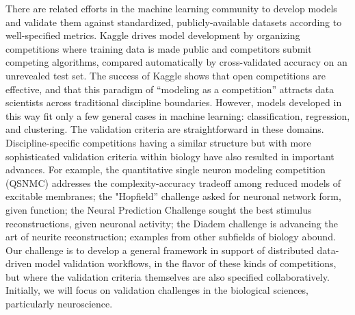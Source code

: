 \documentclass[11pt,letterpaper]{article}
\begin{document}
There are related efforts in the machine learning community to develop models and validate them against standardized, publicly-available datasets according to well-specified metrics. Kaggle\cite{kaggle_url} drives model development by organizing competitions where training data is made public and competitors submit competing algorithms, compared automatically by cross-validated accuracy on an unrevealed test set. The success of Kaggle\cite{carpenter_may_2011} shows that open competitions are effective, and that this paradigm of ``modeling as a competition'' attracts data scientists across traditional discipline boundaries. However, models developed in this way fit only a few general cases in machine learning: classification, regression, and clustering. The validation criteria are straightforward in these domains. Discipline-specific competitions having a similar structure but with more sophisticated validation criteria within biology have also resulted in important advances. For example, the quantitative single neuron modeling competition (QSNMC)\cite{jolivet_quantitative_2008} addresses the complexity-accuracy tradeoff among reduced models of excitable membranes; the "Hopfield'' challenge\cite{hopfield_what_2000} asked for neuronal network form, given function; the Neural Prediction Challenge sought the best stimulus reconstructions, given neuronal activity\cite{neural_prediction_url}; the Diadem challenge is advancing the art of neurite reconstruction\cite{diadem_url}; examples from other subfields of biology abound\cite{dream_url}. Our challenge is to develop a general framework in support of distributed data-driven model validation workflows, in the flavor of these kinds of competitions, but where the validation criteria themselves are also specified collaboratively. Initially, we will focus on validation challenges in the biological sciences, particularly neuroscience. 

\end{document}
